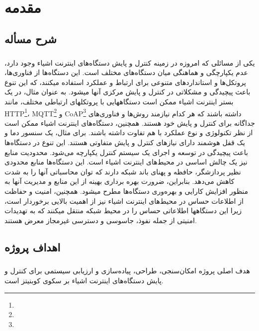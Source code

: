 
\chapter{مقدمه} \label{ch:intro}
\thispagestyle{empty}


\section{شرح مسأله} \label{sec:sharh}
\paragraph{}
{
    یکی از مسائلی که امروزه در زمینه کنترل و پایش دستگاه‌های اینترنت اشیاء وجود دارد، عدم یکپارچگی و هماهنگی
    میان دستگاه‌های مختلف است. این دستگاه‌ها از فناوری‌ها، پروتکل‌ها و استانداردهای متنوعی برای ارتباط و عملکرد
    استفاده میکنند، که این تنوع باعث پیچیدگی و مشکلاتی در کنترل و پایش مرکزی آنها میشود. به عنوان مثال، در یک
    بستر اینترنت اشیاء ممکن است دستگاههایی با پروتکلهای ارتباطی مختلف، مانند
    HTTP\footnote{}،
    MQTT\footnote{}
    و CoAP\footnote{}
    داشته باشند که هر کدام نیازمند روش‌ها و فناوری‌های جداگانه برای کنترل و پایش خود هستند. همچنین، دستگاه‌های
    اینترنت اشیاء ممکن است از نظر تکنولوژی و نوع عملکرد با هم تفاوت داشته باشند. برای مثال، یک سنسور دما و یک قفل هوشمند
    دارای نیازهای کنترل و پایش متفاوتی هستند. این تنوع در دستگاه‌ها باعث پیچیدگی در توسعه و اجرای یک سیستم
    کنترل یکپارچه می‌شود.
    محدودیت منابع نیز یک چالش اساسی در محیط‌های اینترنت اشیاء است. این دستگاه‌ها منابع محدودی نظیر پردازشگر،
    حافظه و پهنای باند شبکه دارند که توان محاسباتی آنها را به شدت کاهش می‌دهد. بنابراین، ضرورت بهره برداری بهینه
    از این منابع و مدیریت آنها به منظور افزایش کارایی و بهره‌وری دستگاه‌ها مطرح میشود. همچنین، امنیت و حفاظت از
    اطلاعات حساس در محیط‌های اینترنت اشیاء نیز از اهمیت بالایی برخوردار است، زیرا این دستگاهها اطلاعاتی حساس
    را در محیط شبکه منتقل میکنند که به تهدیدات امنیتی از جمله نفوذ، جاسوسی و دسترسی غیرمجاز معرض هستند.
}

\section{اهداف پروژه}
\paragraph{}
{
    هدف اصلی پروژه امکان‌سنجی، طراحی، پیاده‌سازی و ارزیابی سیستمی برای کنترل و پایش دستگاه‌های اینترنت اشیاء بر سکوی کوبنیتز است.
}
